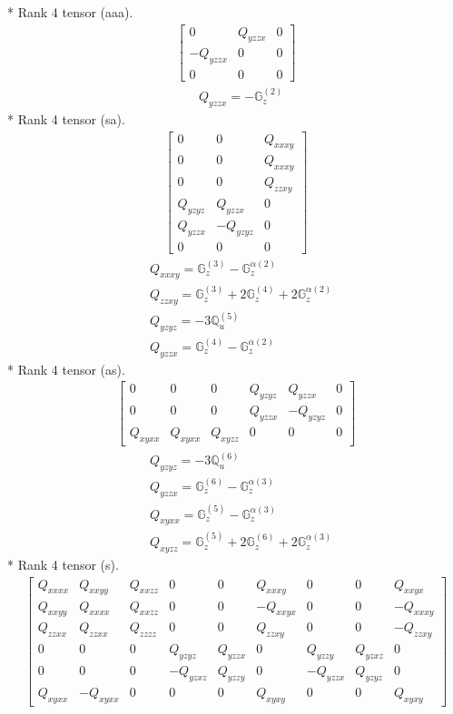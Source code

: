 \documentclass[fleqn,8pt,landscape]{jsarticle}
\begin{document}
* Rank 4 tensor (aaa).
\begin{align*}
\begin{bmatrix} 0 & Q_{yzzx} & 0 \\ - Q_{yzzx} & 0 & 0 \\ 0 & 0 & 0 \end{bmatrix}
\end{align*}
\begin{align*}
& Q_{yzzx} = - \mathbb{G}_{z}^{(2)}
\end{align*}
* Rank 4 tensor (sa).
\begin{align*}
\begin{bmatrix} 0 & 0 & Q_{xxxy} \\ 0 & 0 & Q_{xxxy} \\ 0 & 0 & Q_{zzxy} \\ Q_{yzyz} & Q_{yzzx} & 0 \\ Q_{yzzx} & - Q_{yzyz} & 0 \\ 0 & 0 & 0 \end{bmatrix}
\end{align*}
\begin{align*}
& Q_{xxxy} = \mathbb{G}_{z}^{(3)} - \mathbb{G}_{z}^{\alpha(2)} \\
& Q_{zzxy} = \mathbb{G}_{z}^{(3)} + 2 \mathbb{G}_{z}^{(4)} + 2 \mathbb{G}_{z}^{\alpha(2)} \\
& Q_{yzyz} = - 3 \mathbb{Q}_{u}^{(5)} \\
& Q_{yzzx} = \mathbb{G}_{z}^{(4)} - \mathbb{G}_{z}^{\alpha(2)}
\end{align*}
* Rank 4 tensor (as).
\begin{align*}
\begin{bmatrix} 0 & 0 & 0 & Q_{yzyz} & Q_{yzzx} & 0 \\ 0 & 0 & 0 & Q_{yzzx} & - Q_{yzyz} & 0 \\ Q_{xyxx} & Q_{xyxx} & Q_{xyzz} & 0 & 0 & 0 \end{bmatrix}
\end{align*}
\begin{align*}
& Q_{yzyz} = - 3 \mathbb{Q}_{u}^{(6)} \\
& Q_{yzzx} = \mathbb{G}_{z}^{(6)} - \mathbb{G}_{z}^{\alpha(3)} \\
& Q_{xyxx} = \mathbb{G}_{z}^{(5)} - \mathbb{G}_{z}^{\alpha(3)} \\
& Q_{xyzz} = \mathbb{G}_{z}^{(5)} + 2 \mathbb{G}_{z}^{(6)} + 2 \mathbb{G}_{z}^{\alpha(3)}
\end{align*}
* Rank 4 tensor (s).
\begin{align*}
\begin{bmatrix} Q_{xxxx} & Q_{xxyy} & Q_{xxzz} & 0 & 0 & Q_{xxxy} & 0 & 0 & Q_{xxyx} \\ Q_{xxyy} & Q_{xxxx} & Q_{xxzz} & 0 & 0 & - Q_{xxyx} & 0 & 0 & - Q_{xxxy} \\ Q_{zzxx} & Q_{zzxx} & Q_{zzzz} & 0 & 0 & Q_{zzxy} & 0 & 0 & - Q_{zzxy} \\ 0 & 0 & 0 & Q_{yzyz} & Q_{yzzx} & 0 & Q_{yzzy} & Q_{yzxz} & 0 \\ 0 & 0 & 0 & - Q_{yzxz} & Q_{yzzy} & 0 & - Q_{yzzx} & Q_{yzyz} & 0 \\ Q_{xyxx} & - Q_{xyxx} & 0 & 0 & 0 & Q_{xyxy} & 0 & 0 & Q_{xyxy} \end{bmatrix}
\end{align*}
\end{document}

